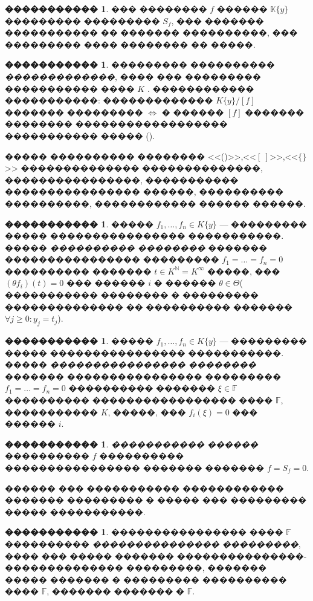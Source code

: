 \documentclass[16pt]{article}
\renewcommand{\ge}{\geqslant} %
\theoremstyle{plain}
\theoremstyle{definition}
\newtheorem{definition}[theorem]{�����������}
\theoremstyle{remark}
\begin{document}
\begin{definition}
��� �������� $f$ ������ $\mathbb{K}\{y\}$ ��������� ��������� $S_f$,
��� ������� ����������� �� ������� ����������, ��� ��������� ���� �������� �� �����.
\end{definition}

\begin{definition} ��������� ���������� {\it �������������}, ����
��� ��������� ����������� ���� $K$ . ������������ �����������:
������������� $K\{y\}/[f]$ ������� ��������� $ \Leftrightarrow$ �
������ $[f]$ ������� �������� ������������������ ����������� �����
(\cite[ ������� 2]{Ferro Theorem 2}).
\end{definition}



����� ���������� �������� <<()>>,<<$[~]$>>,<<$\{\}$>> ��������������
��������������, ����������������, ����������� ����������������
������, ���������� ����������, ������������ ������ ������.


\begin{definition}
����� $f_1,\ldots,f_n\in K\{y\}$ --- ��������� �����
���������������� �����������. �����  {\it ���������� ��������}
������� ���������������� ��������� $f_1=\ldots =f_n=0$ ����������
������� $t\in K^{\mathbb{N}}= K^{\infty}$ �����, ��� $ (\theta f_i)(t)=0$ ���
������ $i$ � ������ $\theta\in\Theta$( ����������� �������� �
��������� �������������� �� ���������� ������� $\forall j\ge 0:
y_j=t_j$).
\end{definition}


\begin{definition}
����� $f_1,\ldots,f_n\in K\{y\}$ --- ���������
����� ���������������� �����������. �����  {\it ����������������
��������} ������� ���������������� ��������� $f_1=\ldots =f_n=0$
���������� ������� $\xi \in \mathbb{F}$ ���������� �����������������
���� $\mathbb{F}$, ����������� $K$, �����, ��� $ f_i(\xi)=0$ ���
������ $i$.
\end{definition}

\begin{definition} {\it ����������� ������} ���������� $f$
���������� ���������������� ������� ������� $f=S_f=0$.
\end{definition}


������ ��� ����������� ������������ ������� ��������� � ����� ���
��������� ����� �����������.

\begin{definition} ���������������� ���� $\mathbb{F}$ ����������
{\it ��������������� ���������}, ���� ��� ����� ������� ���������������-��������������
���������, ������� ����� ������� � ��������� ���������� ���� $\mathbb{F}$,
������� �������  � $\mathbb{F}$.
\end{definition}
\end{document}
